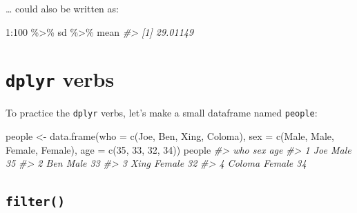 \documentclass[
]{book}
\newenvironment{Shaded}{\begin{snugshade}}{\end{snugshade}}
\newcommand{\AttributeTok}[1]{\textcolor[rgb]{0.77,0.63,0.00}{#1}}
\newcommand{\CommentTok}[1]{\textcolor[rgb]{0.56,0.35,0.01}{\textit{#1}}}
\newcommand{\DecValTok}[1]{\textcolor[rgb]{0.00,0.00,0.81}{#1}}
\newcommand{\FunctionTok}[1]{\textcolor[rgb]{0.00,0.00,0.00}{#1}}
\newcommand{\NormalTok}[1]{#1}
\newcommand{\OtherTok}[1]{\textcolor[rgb]{0.56,0.35,0.01}{#1}}
\newcommand{\SpecialCharTok}[1]{\textcolor[rgb]{0.00,0.00,0.00}{#1}}
\newcommand{\StringTok}[1]{\textcolor[rgb]{0.31,0.60,0.02}{#1}}
\begin{document}
\ldots{} could also be written as:

\begin{Shaded}
\begin{Highlighting}[]
\DecValTok{1}\SpecialCharTok{:}\DecValTok{100} \SpecialCharTok{\%\textgreater{}\%}\NormalTok{ sd }\SpecialCharTok{\%\textgreater{}\%}\NormalTok{ mean}
\CommentTok{\#\textgreater{} [1] 29.01149}
\end{Highlighting}
\end{Shaded}

\hypertarget{dplyr-verbs}{%
\section*{\texorpdfstring{\texttt{dplyr} verbs}{dplyr verbs}}\label{dplyr-verbs}}

To practice the \texttt{dplyr} verbs, let's make a small dataframe named \texttt{people}:

\begin{Shaded}
\begin{Highlighting}[]
\NormalTok{people }\OtherTok{\textless{}{-}} \FunctionTok{data.frame}\NormalTok{(}\AttributeTok{who =} \FunctionTok{c}\NormalTok{(}\StringTok{\textquotesingle{}Joe\textquotesingle{}}\NormalTok{, }\StringTok{\textquotesingle{}Ben\textquotesingle{}}\NormalTok{, }\StringTok{\textquotesingle{}Xing\textquotesingle{}}\NormalTok{, }\StringTok{\textquotesingle{}Coloma\textquotesingle{}}\NormalTok{),}
                    \AttributeTok{sex =} \FunctionTok{c}\NormalTok{(}\StringTok{\textquotesingle{}Male\textquotesingle{}}\NormalTok{, }\StringTok{\textquotesingle{}Male\textquotesingle{}}\NormalTok{, }\StringTok{\textquotesingle{}Female\textquotesingle{}}\NormalTok{, }\StringTok{\textquotesingle{}Female\textquotesingle{}}\NormalTok{),}
                    \AttributeTok{age =} \FunctionTok{c}\NormalTok{(}\DecValTok{35}\NormalTok{, }\DecValTok{33}\NormalTok{, }\DecValTok{32}\NormalTok{, }\DecValTok{34}\NormalTok{))}
\NormalTok{people}
\CommentTok{\#\textgreater{}      who    sex age}
\CommentTok{\#\textgreater{} 1    Joe   Male  35}
\CommentTok{\#\textgreater{} 2    Ben   Male  33}
\CommentTok{\#\textgreater{} 3   Xing Female  32}
\CommentTok{\#\textgreater{} 4 Coloma Female  34}
\end{Highlighting}
\end{Shaded}

\hypertarget{filter}{%
\subsection*{\texorpdfstring{\texttt{filter()}}{filter()}}\label{filter}}
\end{document}
